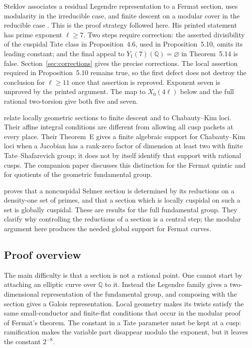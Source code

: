 \documentclass[11pt,a4paper]{article}
\newcommand{\Q}{\mathbb Q}
\theoremstyle{plain}
\theoremstyle{definition}
\begin{document}
Steklov associates a residual Legendre representation to a Fermat section,
uses modularity in the irreducible case, and finite descent on a modular
cover in the reducible case \citep[Theorem~A; \S5]{steklov}. This is the
proof strategy followed here. His printed statement has prime exponent
$\ell\geq7$. Two steps require correction: the asserted divisibility of
the cuspidal Tate class in Proposition~4.6, used in Proposition~5.10,
omits its leading constant; and the final appeal to
$Y_1(7)(\Q)=\varnothing$ in Theorem~5.14 is false. Section~\ref{sec:corrections}
gives the precise corrections. The local assertion required in
Proposition~5.10 remains true, so the first defect does not destroy the
conclusion for $\ell\geq11$ once that assertion is reproved. Exponent seven
is unproved by the printed argument. The map to $X_0(4\ell)$ below and
the full rational two-torsion give both five and seven.

\citet[Theorems~A, C, and E]{bkl} relate locally geometric sections to
finite descent and to Chabauty--Kim loci. Their affine integral conditions
are different from allowing all cusp packets at every place. Their
Theorem~E gives a finite algebraic support for Chabauty--Kim loci when a
Jacobian has a rank-zero factor of dimension at least two with finite
Tate--Shafarevich group; it does not by itself identify that support with
rational cusps. The companion paper discusses this distinction for the
Fermat quintic and for quotients of the geometric fundamental group.

\citet[Theorems~1.1--1.2, pp.~1--2, and Theorem~2.2,
pp.~3--4]{porowski} proves that a noncuspidal Selmer section is
determined by its reductions on a density-one set of primes, and that
a section which is locally cuspidal on such a set is globally cuspidal.
These are results for the full fundamental group. They clarify why
controlling the reductions of a section is a central step; the modular
argument here produces the needed global support for Fermat curves.

\subsection{Proof overview}

The main difficulty is that a section is not a rational point. One cannot
start by attaching an elliptic curve over $\Q$ to it. Instead the Legendre
family gives a two-dimensional representation of the fundamental group,
and composing with the section gives a Galois representation. Local
geometry makes its twists satisfy the same small-conductor and
finite-flat conditions that occur in the modular proof of Fermat's theorem.
The constant in a Tate parameter must be kept at a cusp: ramification
makes the variable part disappear modulo the exponent, but it leaves the
constant $2^{-8}$.
\end{document}
